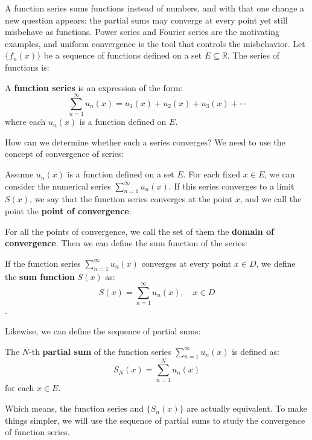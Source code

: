 A function series sums functions instead of numbers, and with that one change a new question appears: the partial sums may converge at every point yet still misbehave as functions. Power series and Fourier series are the motivating examples, and uniform convergence is the tool that controls the misbehavior. Let $\{f_n(x)\}$ be a sequence of functions defined on a set $E \subseteq \mathbb{R}$. The series of functions is:

\begin{definition}
A \textbf{function series} is an expression of the form:
\[ \sum_{n=1}^{\infty} u_n(x) = u_1(x) + u_2(x) + u_3(x) + \cdots \]
where each $u_n(x)$ is a function defined on $E$.
\end{definition}

How can we determine whether such a series converges? We need to use the concept of convergence of series:

\begin{definition}
    Assume $u_n(x)$ is a function defined on a set $E$. For each fixed $x \in E$, we can consider the numerical series $\sum_{n=1}^{\infty} u_n(x)$. If this series converges to a limit $S(x)$, we say that the function series converges at the point $x$, and we call the point the \textbf{point of convergence}.
\end{definition}

For all the points of convergence, we call the set of them the \textbf{domain of convergence}. Then we can define the sum function of the series:

\begin{definition}
If the function series $\sum_{n=1}^{\infty} u_n(x)$ converges at every point $x \in D$, we define the \textbf{sum function} $S(x)$ as:
\[ S(x) = \sum_{n=1}^{\infty} u_n(x), \quad x \in D \].
\end{definition}

Likewise, we can define the sequence of partial sums:

\begin{definition}
The $N$-th \textbf{partial sum} of the function series $\sum_{n=1}^{\infty} u_n(x)$ is defined as:
\[ S_N(x) = \sum_{n=1}^{N} u_n(x) \]
for each $x \in E$.
\end{definition}

Which means, the function series and $\{S_n(x)\}$ are actually equivalent. To make things simpler, we will use the sequence of partial sums to study the convergence of function series.

